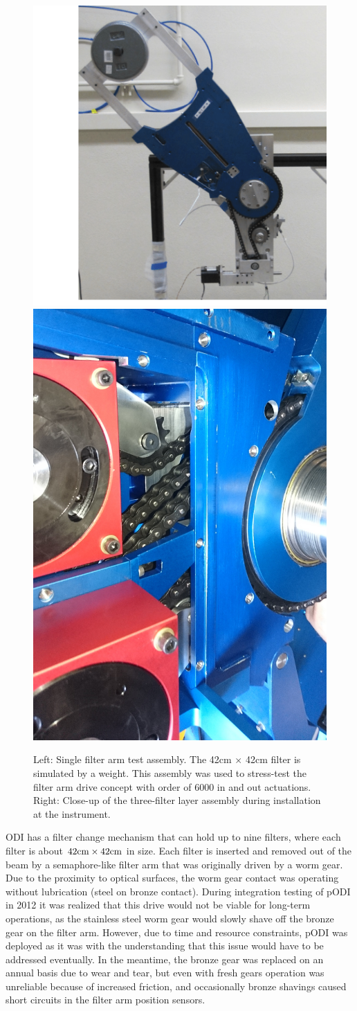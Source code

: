 \documentclass[]{spieman}
\begin{document}
\begin{figure}
	
	\hfill
	\includegraphics[height=0.49\textwidth]{images/filterdrivetest.png}	\hfill
	\includegraphics[height=0.49\textwidth]{images/DSC_0309.JPG} \hfill \hfill
    
	\caption{\label{fig_filterdrive} Left: Single filter arm test assembly. The
    42cm $\times$ 42cm filter is simulated by a weight. This assembly was used to stress-test
    the filter arm drive concept with order of 6000 in and out actuations.
    Right: Close-up of the three-filter layer assembly during installation at the
    instrument.} 

\end{figure}

ODI has a filter change mechanism that can hold up to nine filters, where each
filter is about $42 \rm{cm} \times 42 \rm{cm}$ in size. Each filter is inserted
and removed out of the beam by a semaphore-like filter arm that was originally
driven by a worm gear\cite{Muller2008}. Due to the proximity to optical
surfaces, the worm gear contact was operating without lubrication (steel on
bronze contact). During integration testing of pODI in 2012 it was realized that
this drive would not be viable for long-term operations, as the stainless steel
worm gear would slowly shave off the bronze gear on the filter arm. However, due
to time and resource constraints, pODI was deployed as it was with the
understanding that this issue would have to be addressed eventually. In the
meantime, the bronze gear was replaced on an annual basis due to wear and tear,
but even with fresh gears operation was unreliable because of increased
friction, and occasionally bronze shavings caused short circuits in the filter
arm position sensors.
\end{document}
